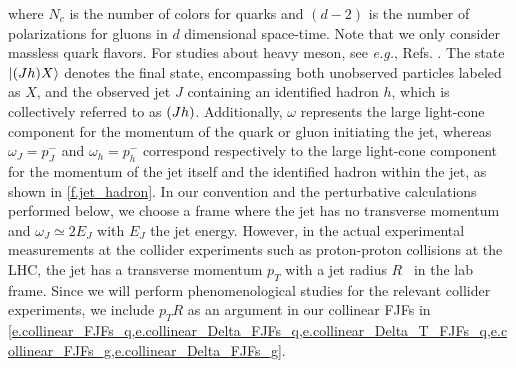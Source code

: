 \documentclass[a4paper, 11 pt]{article}
\begin{document}
\endgroup
where $N_c$ is the number of colors for quarks and $(d-2)$ is the number of polarizations for gluons in $d$ dimensional space-time. Note that we only consider massless quark flavors.
For studies about heavy meson, see \textit{e.g.}, Refs. \cite{vonKuk:2023jfd, Makris:2018npl, Dai:2018ywt, Anderle:2017cgl}.
The state $\ket{\pqty{Jh} X}$ denotes the final state, encompassing both unobserved particles labeled as $X$, and the observed jet $J$ containing an identified hadron $h$, which is collectively referred to as $\pqty{Jh}$. 
Additionally, $\omega$ represents the large light-cone component for the momentum of the quark or gluon initiating the jet, whereas $\omega_J=p_J^-$ and $\omega_h=p_h^-$ correspond respectively to the large light-cone component for the momentum of the jet itself and the identified hadron within the jet, as shown in \cref{f.jet_hadron}. In our convention and the perturbative calculations performed below, we choose a frame where the jet has no transverse momentum and $\omega_J  \simeq 2E_J$ with $E_J$ the jet energy. However, in the actual experimental measurements at the collider experiments such as proton-proton collisions at the LHC, the jet has a transverse momentum $p_T$ with a jet radius $R$~\cite{Cacciari:2008gp} in the lab frame. Since we will perform phenomenological studies for the relevant collider experiments, we include $p_TR$ as an argument in our collinear FJFs in \cref{e.collinear_FJFs_q,e.collinear_Delta_FJFs_q,e.collinear_Delta_T_FJFs_q,e.collinear_FJFs_g,e.collinear_Delta_FJFs_g}.
\end{document}
